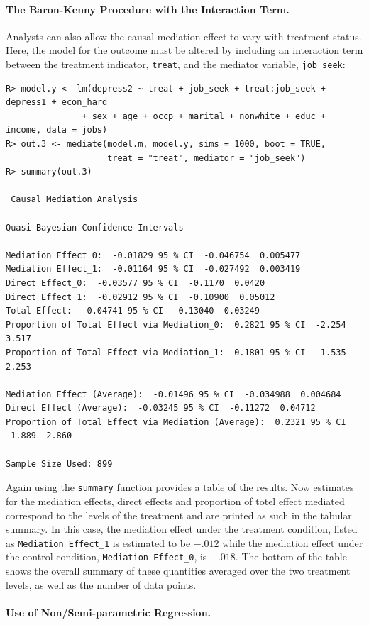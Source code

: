 \documentclass[11pt,letterpaper]{article}
\theoremstyle{plain}
\begin{document}
\paragraph{The Baron-Kenny Procedure with the Interaction Term.}
Analysts can also allow the causal mediation effect to vary with
treatment status.  Here, the model for the outcome must be altered by
including an interaction term between the treatment indicator,
\texttt{treat}, and the mediator variable, \texttt{job\_seek}:
\begin{verbatim}
R> model.y <- lm(depress2 ~ treat + job_seek + treat:job_seek + depress1 + econ_hard
               + sex + age + occp + marital + nonwhite + educ + income, data = jobs)
R> out.3 <- mediate(model.m, model.y, sims = 1000, boot = TRUE,
                    treat = "treat", mediator = "job_seek")
R> summary(out.3)

 Causal Mediation Analysis 

Quasi-Bayesian Confidence Intervals

Mediation Effect_0:  -0.01829 95 % CI  -0.046754  0.005477 
Mediation Effect_1:  -0.01164 95 % CI  -0.027492  0.003419 
Direct Effect_0:  -0.03577 95 % CI  -0.1170  0.0420 
Direct Effect_1:  -0.02912 95 % CI  -0.10900  0.05012 
Total Effect:  -0.04741 95 % CI  -0.13040  0.03249 
Proportion of Total Effect via Mediation_0:  0.2821 95 % CI  -2.254  3.517 
Proportion of Total Effect via Mediation_1:  0.1801 95 % CI  -1.535  2.253 

Mediation Effect (Average):  -0.01496 95 % CI  -0.034988  0.004684 
Direct Effect (Average):  -0.03245 95 % CI  -0.11272  0.04712 
Proportion of Total Effect via Mediation (Average):  0.2321 95 % CI  -1.889  2.860 

Sample Size Used: 899 
\end{verbatim}
Again using the \texttt{summary} function provides a table of the
results. Now estimates for the mediation effects, direct effects and 
proportion of totel effect mediated correspond
to the levels of the treatment and are printed as such in the tabular
summary.  In this case, the mediation effect under the treatment
condition, listed as \texttt{Mediation Effect\_1} is estimated to be
$-.012$ while the mediation effect under the control condition,
\texttt{Mediation Effect\_0}, is $-.018$.  The bottom of the table shows
the overall summary of these quantities averaged over the two treatment levels,
as well as the number of data points.

\paragraph{Use of Non/Semi-parametric Regression.}
\end{document}
